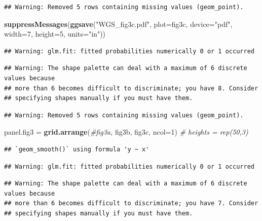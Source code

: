 \documentclass[
]{article}
\newenvironment{Shaded}{\begin{snugshade}}{\end{snugshade}}
\newcommand{\CommentTok}[1]{\textcolor[rgb]{0.56,0.35,0.01}{\textit{#1}}}
\newcommand{\DataTypeTok}[1]{\textcolor[rgb]{0.13,0.29,0.53}{#1}}
\newcommand{\DecValTok}[1]{\textcolor[rgb]{0.00,0.00,0.81}{#1}}
\newcommand{\KeywordTok}[1]{\textcolor[rgb]{0.13,0.29,0.53}{\textbf{#1}}}
\newcommand{\NormalTok}[1]{#1}
\newcommand{\StringTok}[1]{\textcolor[rgb]{0.31,0.60,0.02}{#1}}
\begin{document}
\begin{verbatim}
## Warning: Removed 5 rows containing missing values (geom_point).
\end{verbatim}

\begin{Shaded}
\begin{Highlighting}[]
\KeywordTok{suppressMessages}\NormalTok{(}\KeywordTok{ggsave}\NormalTok{(}\StringTok{"WGS_fig3c.pdf"}\NormalTok{, }\DataTypeTok{plot=}\NormalTok{fig3c, }\DataTypeTok{device=}\StringTok{"pdf"}\NormalTok{, }\DataTypeTok{width=}\DecValTok{7}\NormalTok{, }\DataTypeTok{height=}\DecValTok{5}\NormalTok{, }\DataTypeTok{units=}\StringTok{"in"}\NormalTok{))}
\end{Highlighting}
\end{Shaded}

\begin{verbatim}
## Warning: glm.fit: fitted probabilities numerically 0 or 1 occurred
\end{verbatim}

\begin{verbatim}
## Warning: The shape palette can deal with a maximum of 6 discrete values because
## more than 6 becomes difficult to discriminate; you have 8. Consider
## specifying shapes manually if you must have them.
\end{verbatim}

\begin{verbatim}
## Warning: Removed 5 rows containing missing values (geom_point).
\end{verbatim}

\begin{Shaded}
\begin{Highlighting}[]
\NormalTok{panel.fig3 =}\StringTok{ }\KeywordTok{grid.arrange}\NormalTok{(}\CommentTok{#fig3a, }
\NormalTok{  fig3b, fig3c, }\DataTypeTok{ncol=}\DecValTok{1}\NormalTok{) }\CommentTok{#  heights = rep(50,3)}
\end{Highlighting}
\end{Shaded}

\begin{verbatim}
## `geom_smooth()` using formula 'y ~ x'
\end{verbatim}

\begin{verbatim}
## Warning: glm.fit: fitted probabilities numerically 0 or 1 occurred
\end{verbatim}

\begin{verbatim}
## Warning: The shape palette can deal with a maximum of 6 discrete values because
## more than 6 becomes difficult to discriminate; you have 7. Consider
## specifying shapes manually if you must have them.
\end{verbatim}
\end{document}
